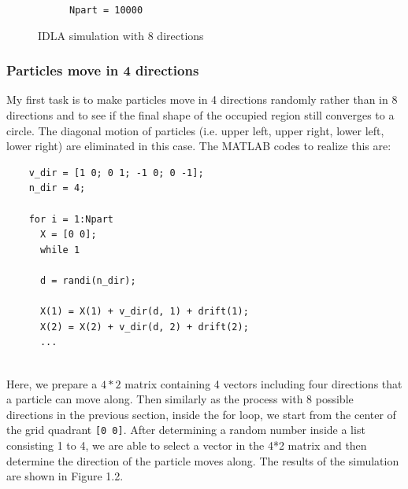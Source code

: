 \documentclass[letterpaper]{article}
\numberwithin{equation}{section} %
\numberwithin{figure}{section} %
\numberwithin{table}{section} %
\begin{document}
\begin{figure}[htbp]
\begin{subfigure}[b]{0.3\textwidth}
		\caption{\texttt{Npart = 10000}}
		\label{8direct_Npart10000_3suW11T}
	\end{subfigure}
	\caption{IDLA simulation with 8 directions}
	\label{IDLA simulation with 8 directions}
\end{figure}
	



\subsubsection{Particles move in 4 directions}
My first task is to make particles move in 4 directions randomly rather than in 8 directions and to see if the final shape of the occupied region still converges to a circle. The diagonal motion of particles (i.e. upper left, upper right, lower left, lower right) are eliminated in this case. The MATLAB codes to realize this are:

\begin{lstlisting}
    v_dir = [1 0; 0 1; -1 0; 0 -1];
    n_dir = 4;
    
    for i = 1:Npart
      X = [0 0];
      while 1
    
      d = randi(n_dir);
    
      X(1) = X(1) + v_dir(d, 1) + drift(1); 
      X(2) = X(2) + v_dir(d, 2) + drift(2);
      ...
      
\end{lstlisting}

\noindent
Here, we prepare a $4*2$ matrix containing 4 vectors including four directions that a particle can move along. Then similarly as the process with 8 possible directions in the previous section, inside the for loop, we start from the center of the grid quadrant \texttt{[0 0]}. After determining a random number inside a list consisting 1 to 4, we are able to select a vector in the 4*2 matrix and then determine the direction of the particle moves along. The results of the simulation are shown in Figure 1.2.
\end{document}
